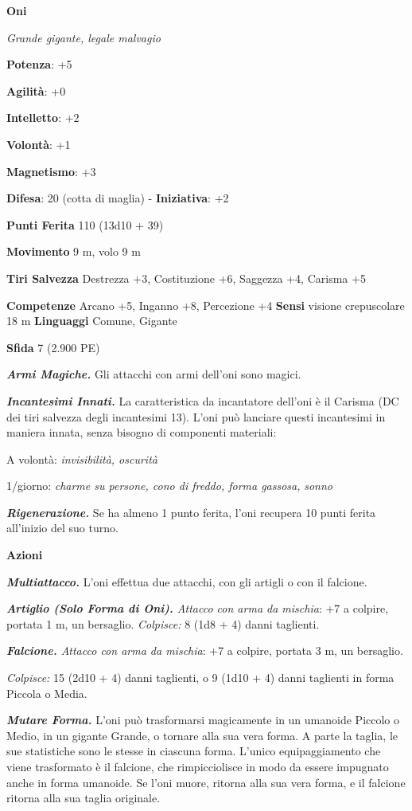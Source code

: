 \begin{multicols}{2}
\textbf{Oni}

\emph{Grande gigante, legale malvagio}

\textbf{Potenza}: +5

\textbf{Agilità}: +0

\textbf{Intelletto}: +2

\textbf{Volontà}: +1

\textbf{Magnetismo}: +3

\textbf{Difesa}: 20 (cotta di maglia) - \textbf{Iniziativa}: +2

\textbf{Punti Ferita} 110 (13d10 + 39)

\textbf{Movimento} 9 m, volo 9 m  

\textbf{Tiri Salvezza} Destrezza +3, Costituzione +6, Saggezza +4,
Carisma +5

\textbf{Competenze} Arcano +5, Inganno +8, Percezione +4 \textbf{Sensi}
visione crepuscolare 18 m \textbf{Linguaggi} Comune,
Gigante

\textbf{Sfida} 7 (2.900 PE)\smallskip

\emph{\textbf{Armi Magiche.}} Gli attacchi con armi dell'oni sono
magici.

\emph{\textbf{Incantesimi Innati.}} La caratteristica da incantatore
dell'oni è il Carisma (DC dei tiri salvezza degli incantesimi 13). L'oni
può lanciare questi incantesimi in maniera innata, senza bisogno di
componenti materiali:

A volontà: \emph{invisibilità, oscurità}

1/giorno: \emph{charme su persone, cono di freddo, forma gassosa,}
\emph{sonno}

\emph{\textbf{Rigenerazione.}} Se ha almeno 1 punto ferita, l'oni
recupera 10 punti ferita all'inizio del suo turno.

\smallskip\textbf{Azioni}

\emph{\textbf{Multiattacco.}} L'oni effettua due attacchi, con gli
artigli o con il falcione.

\emph{\textbf{Artiglio (Solo Forma di Oni).} Attacco con arma da
mischia}: +7 a colpire, portata 1 m, un bersaglio. \emph{Colpisce:} 8
(1d8 + 4) danni taglienti.

\emph{\textbf{Falcione.} Attacco con arma da mischia}: +7 a colpire,
portata 3 m, un bersaglio.

\emph{Colpisce:} 15 (2d10 + 4) danni taglienti, o 9 (1d10 + 4) danni
taglienti in forma Piccola o Media.

\emph{\textbf{Mutare Forma.}} L'oni può trasformarsi magicamente in un
umanoide Piccolo o Medio, in un gigante Grande, o tornare alla sua vera
forma. A parte la taglia, le sue statistiche sono le stesse in ciascuna
forma. L'unico equipaggiamento che viene trasformato è il falcione, che
rimpicciolisce in modo da essere impugnato anche in forma umanoide. Se
l'oni muore, ritorna alla sua vera forma, e il falcione ritorna alla sua
taglia originale.


\end{multicols}
